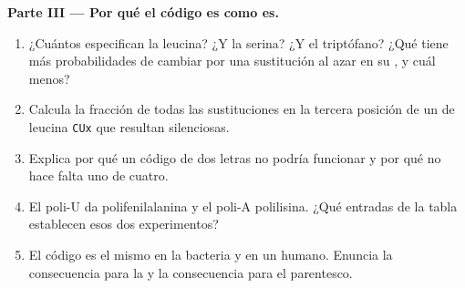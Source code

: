 \begin{problem}
\medskip
\noindent\textbf{Parte III --- Por qué el código es como es.}
\begin{enumerate}[resume]
  \item ¿Cuántos  especifican la leucina? ¿Y la serina? ¿Y el
        triptófano? ¿Qué  tiene más probabilidades de cambiar
        por una sustitución al azar en su , y cuál menos?
  \item Calcula la fracción de todas las sustituciones en la tercera
        posición de un  de leucina \texttt{CUx} que resultan
        silenciosas.
  \item Explica por qué un código de dos letras no podría funcionar y
        por qué no hace falta uno de cuatro.
  \item El poli-U da polifenilalanina y el poli-A polilisina. ¿Qué
        entradas de la tabla establecen esos dos experimentos?
  \item El código es el mismo en la bacteria y en un humano. Enuncia la
        consecuencia para la  y la consecuencia para el
        parentesco.
\end{enumerate}


\end{problem}
